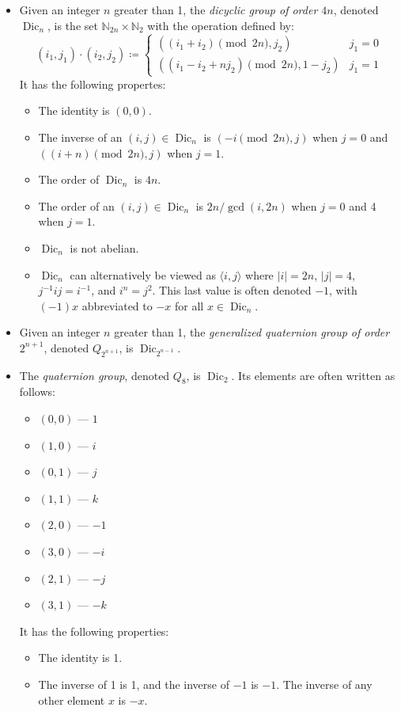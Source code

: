 \documentclass{article}
\newcommand{\N}{\mathbb{N}}
\DeclareMathOperator{\Dic}{Dic}
\newcommand{\gen}[1]{\langle #1\rangle}
\begin{document}
\begin{itemize}
\item Given an integer $n$ greater than 1, the \emph{dicyclic group of order $4n$}, denoted $\Dic_n$, is the set $\N_{2n}\times\N_2$ with the operation defined by: $$(i_1, j_1)\cdot(i_2, j_2)\coloneqq \begin{cases}((i_1 + i_2) \pmod{2n}, j_2) & j_1 = 0 \\ ((i_1 - i_2 + nj_2) \pmod{2n}, 1-j_2) & j_1 = 1\end{cases}$$  It has the following propertes:
 \begin{itemize}
 \item The identity is $(0,0)$.
 \item The inverse of an $(i,j)\in\Dic_n$ is $(-i\pmod{2n}, j)$ when $j=0$ and $((i+n)\pmod{2n}, j)$ when $j=1$.
 \item The order of $\Dic_n$ is $4n$.
 \item The order of an $(i,j)\in\Dic_n$ is $2n/\gcd(i,2n)$ when $j=0$ and 4 when $j=1$.
 \item $\Dic_n$ is not abelian.
 \item $\Dic_n$ can alternatively be viewed as $\gen{i,j}$ where $|i| = 2n$, $|j| = 4$, $j^{-1}ij = i^{-1}$, and $i^n = j^2$.  This last value is often denoted $-1$, with $(-1)x$ abbreviated to $-x$ for all $x\in\Dic_n$.
 \end{itemize}
\item Given an integer $n$ greater than 1, the \emph{generalized quaternion group of order $2^{n+1}$}, denoted $Q_{2^{n+1}}$, is $\Dic_{2^{n-1}}$.
\item The \emph{quaternion group}, denoted $Q_8$, is $\Dic_2$.  Its elements are often written as follows:
 \begin{itemize}
 \item $(0,0)$ --- $1$
 \item $(1,0)$ --- $i$
 \item $(0,1)$ --- $j$
 \item $(1,1)$ --- $k$
 \item $(2,0)$ --- $-1$
 \item $(3,0)$ --- $-i$
 \item $(2,1)$ --- $-j$
 \item $(3,1)$ --- $-k$
 \end{itemize}
 It has the following properties:
 \begin{itemize}
 \item The identity is 1.
 \item The inverse of 1 is 1, and the inverse of $-1$ is $-1$.  The inverse of any other element $x$ is $-x$.

\end{itemize}
\end{itemize}
\end{document}
